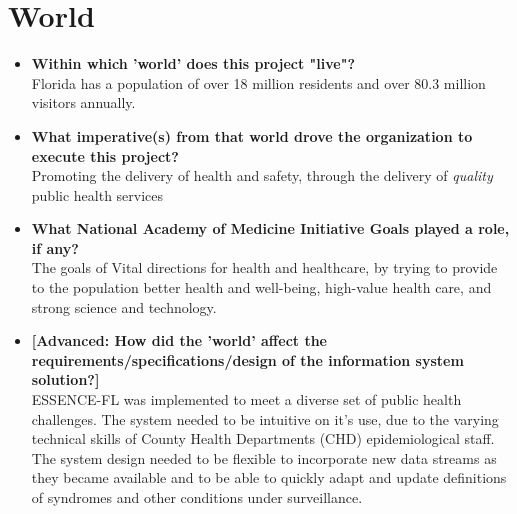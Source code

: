 \documentclass{article}
\begin{document}
\section{World}
\begin{itemize}
\item{\textbf{Within which 'world' does this project "live"?}}\\
Florida has a population of over 18 million residents and over 80.3 million visitors annually.
\item{\textbf{What imperative(s) from that world drove the organization to execute this project?}}\\
Promoting the delivery of health and safety, through the delivery of \textit{quality} public health services
\item{\textbf{What National Academy of Medicine Initiative Goals played a role, if any?}}\\
The goals of Vital directions for health and healthcare, by trying to provide to the population better health and well-being, high-value health care, and strong science and technology.
\item{\textbf{[Advanced: How did the 'world' affect the requirements/specifications/design of the information system solution?]}}\\
ESSENCE-FL was implemented to meet a diverse set of public health challenges. The system needed to be intuitive on it's use, due to the varying technical skills of County Health Departments (CHD) epidemiological staff. The system design needed to be flexible to incorporate new data streams as they became available and to be able to quickly adapt and update definitions of syndromes and other conditions under surveillance.
\end{itemize}
\pagebreak
\end{document}
